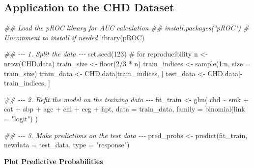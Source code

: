\documentclass[
  letterpaper,
]{scrbook}
\newenvironment{Shaded}{\begin{snugshade}}{\end{snugshade}}
\newcommand{\AttributeTok}[1]{\textcolor[rgb]{0.40,0.45,0.13}{#1}}
\newcommand{\CommentTok}[1]{\textcolor[rgb]{0.37,0.37,0.37}{#1}}
\newcommand{\DecValTok}[1]{\textcolor[rgb]{0.68,0.00,0.00}{#1}}
\newcommand{\DocumentationTok}[1]{\textcolor[rgb]{0.37,0.37,0.37}{\textit{#1}}}
\newcommand{\FunctionTok}[1]{\textcolor[rgb]{0.28,0.35,0.67}{#1}}
\newcommand{\NormalTok}[1]{\textcolor[rgb]{0.00,0.23,0.31}{#1}}
\newcommand{\OtherTok}[1]{\textcolor[rgb]{0.00,0.23,0.31}{#1}}
\newcommand{\SpecialCharTok}[1]{\textcolor[rgb]{0.37,0.37,0.37}{#1}}
\newcommand{\StringTok}[1]{\textcolor[rgb]{0.13,0.47,0.30}{#1}}
\begin{document}
\subsection{Application to the CHD
Dataset}\label{application-to-the-chd-dataset}

\begin{Shaded}
\begin{Highlighting}[]
\DocumentationTok{\#\# Load the pROC library for AUC calculation}
\DocumentationTok{\#\# install.packages("pROC") \# Uncomment to install if needed}
\FunctionTok{library}\NormalTok{(pROC)}

\DocumentationTok{\#\# {-}{-}{-} 1. Split the data {-}{-}{-}}
\FunctionTok{set.seed}\NormalTok{(}\DecValTok{123}\NormalTok{) }\CommentTok{\# for reproducibility}
\NormalTok{n }\OtherTok{\textless{}{-}} \FunctionTok{nrow}\NormalTok{(CHD.data)}
\NormalTok{train\_size }\OtherTok{\textless{}{-}} \FunctionTok{floor}\NormalTok{(}\DecValTok{2}\SpecialCharTok{/}\DecValTok{3} \SpecialCharTok{*}\NormalTok{ n)}
\NormalTok{train\_indices }\OtherTok{\textless{}{-}} \FunctionTok{sample}\NormalTok{(}\DecValTok{1}\SpecialCharTok{:}\NormalTok{n, }\AttributeTok{size =}\NormalTok{ train\_size)}
\NormalTok{train\_data }\OtherTok{\textless{}{-}}\NormalTok{ CHD.data[train\_indices, ]}
\NormalTok{test\_data  }\OtherTok{\textless{}{-}}\NormalTok{ CHD.data[}\SpecialCharTok{{-}}\NormalTok{train\_indices, ]}

\DocumentationTok{\#\# {-}{-}{-} 2. Refit the model on the training data {-}{-}{-}}
\NormalTok{fit\_train }\OtherTok{\textless{}{-}} \FunctionTok{glm}\NormalTok{(}
\NormalTok{  chd }\SpecialCharTok{\textasciitilde{}}\NormalTok{ smk }\SpecialCharTok{+}\NormalTok{ cat }\SpecialCharTok{+}\NormalTok{ sbp }\SpecialCharTok{+}\NormalTok{ age }\SpecialCharTok{+}\NormalTok{ chl }\SpecialCharTok{+}\NormalTok{ ecg }\SpecialCharTok{+}\NormalTok{ hpt,}
  \AttributeTok{data =}\NormalTok{ train\_data,}
  \AttributeTok{family =} \FunctionTok{binomial}\NormalTok{(}\AttributeTok{link =} \StringTok{"logit"}\NormalTok{)}
\NormalTok{)}

\DocumentationTok{\#\# {-}{-}{-} 3. Make predictions on the test data {-}{-}{-}}
\NormalTok{pred\_probs }\OtherTok{\textless{}{-}} \FunctionTok{predict}\NormalTok{(fit\_train, }\AttributeTok{newdata =}\NormalTok{ test\_data, }\AttributeTok{type =} \StringTok{"response"}\NormalTok{)}
\end{Highlighting}
\end{Shaded}

\textbf{Plot Predictive Probabilities}
\end{document}
